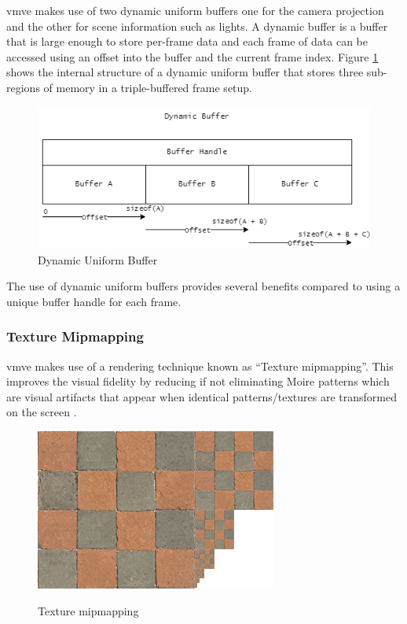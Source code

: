 \documentclass[11pt]{article}
\begin{document}
\gls*{vmve} makes use of two dynamic uniform buffers one for the camera
projection and the other for scene information such as lights. A dynamic buffer
is a buffer that is large enough to store per-frame data and each frame of data
can be accessed using an offset into the buffer and the current frame index.
Figure \ref{fig:dynamic_uniform_buffer} shows the internal structure of a dynamic
uniform buffer that stores three sub-regions of memory in a triple-buffered
frame setup.

\begin{figure}[H]
  \centering
  \includegraphics[width=\textwidth]{images/dynamic_buffer.png}
  \caption{Dynamic Uniform Buffer}
  \label{fig:dynamic_uniform_buffer}
\end{figure}

The use of dynamic uniform buffers provides several benefits compared to using a
unique buffer handle for each frame.

\subsubsection{Texture Mipmapping}
\gls*{vmve} makes use of a rendering technique known as ``Texture mipmapping''.
This improves the visual fidelity by reducing if not eliminating Moire patterns
which are visual artifacts that appear when identical patterns/textures are
transformed on the screen \cite{moire_pattern}.

\begin{figure}[H]
  \centering
  \includegraphics[width=\textwidth]{images/mipmaps.png}
  \caption{Texture mipmapping}
  \label{fig:texture_mipmapping} \cite{texture_mipmaps}
\end{figure}
\end{document}
